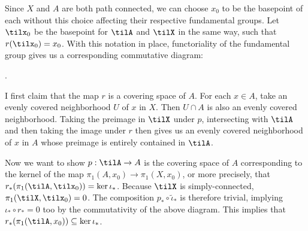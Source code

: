\begin{homework}[e]
\begin{prf}
    \begin{center}
    \end{center}
    Since $X$ and $A$ are both path connected, we can choose $x_0$ to be the basepoint of each without this choice affecting their respective fundamental groups. Let $\tilx_0$ be the basepoint for $\tilA$ and $\tilX$ in the same way, such that $r(\tilx_0) = x_0$. With this notation in place, functoriality of the fundamental group gives us a corresponding commutative diagram:
    \begin{center}
      .
    \end{center}
    
    I first claim that the map $r$ is a covering space of $A$. For each $x \in A$, take an evenly covered neighborhood $U$ of $x$ in $X$. Then $U\cap A$ is also an evenly covered neighborhood. Taking the preimage in $\tilX$ under $p$, intersecting with $\tilA$ and then taking the image under $r$ then gives us an evenly covered neighborhood of $x$ in $A$ whose preimage is entirely contained in $\tilA$.

    Now we want to show $p:\tilA\to A$ is the covering space of $A$ corresponding to the kernel of the map $\pi_1(A,x_0) \to \pi_1(X,x_0)$, or more precisely, that $r_*(\pi_1(\tilA,\tilx_0)) = \ker \iota_*$. Because $\tilX$ is simply-connected, $\pi_1(\tilX,\tilx_0) = 0$. The composition $p_*\circ \tilde{\iota}_*$ is therefore trivial, implying $\iota_* \circ r_* = 0$ too by the commutativity of the above diagram. This implies that $r_*(\pi_{1}(\tilA,x_0))\subseteq \ker \iota_*$.


\end{prf}
\end{homework}
